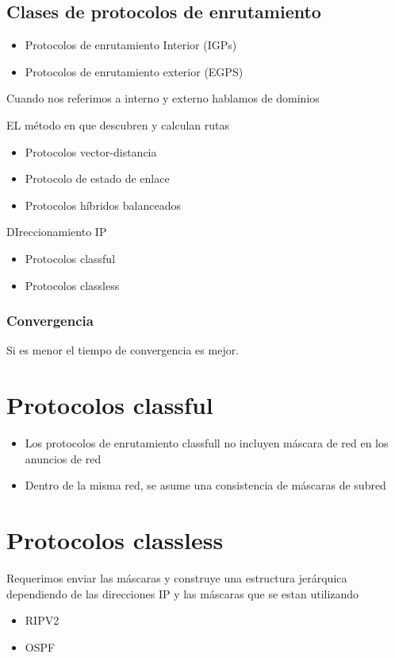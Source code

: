 \subsection{Clases de protocolos de enrutamiento}
\begin{itemize}
    \item Protocolos de enrutamiento Interior (IGPs)
    \item Protocolos de enrutamiento exterior (EGPS)
\end{itemize}

Cuando nos referimos a interno y externo hablamos de dominios 

EL método en que descubren y calculan rutas 
\begin{itemize}
    \item Protocolos vector-distancia 
    \item Protocolo de estado de enlace 
    \item Protocolos híbridos balanceados 
\end{itemize}

DIreccionamiento IP 
\begin{itemize}
    \item Protocolos classful 
    \item Protocolos classless
\end{itemize}

\subsubsection{Convergencia}
Si es menor el tiempo de convergencia es mejor. 

\section{Protocolos classful}
\begin{itemize}
    \item {Los protocolos de enrutamiento classfull no incluyen máscara de red en los anuncios de red}
    \item {Dentro de la misma red, se asume una consistencia de máscaras de subred}
\end{itemize}

\section{Protocolos classless}
Requerimos enviar las máscaras y construye una estructura jerárquica dependiendo de las direcciones IP y las máscaras que se estan utilizando 
\begin{itemize}
    \item RIPV2 
    \item OSPF
\end{itemize}

